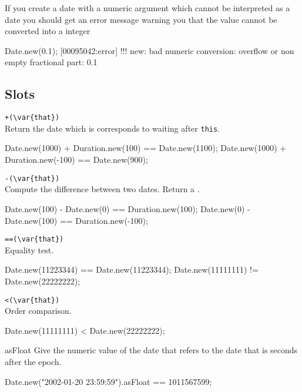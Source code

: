 If you create a date with a numeric argument which cannot be interpreted as
a date you should get an error message warning you that the value cannot be
converted into a integer

\begin{urbiscript}
Date.new(0.1);
[00095042:error] !!! new: bad numeric conversion: overflow or non empty fractional part: 0.1
\end{urbiscript}

\subsection{Slots}

\begin{urbiscriptapi}
\item \lstinline|+(\var{that})|\\
  Return the date which is corresponds to waiting 
   after \lstinline|this|.
\begin{urbiassert}
Date.new(1000) + Duration.new(100) == Date.new(1100);
Date.new(1000) + Duration.new(-100) == Date.new(900);
\end{urbiassert}

\item \lstinline|-(\var{that})|\\
  Compute the difference between two dates.  Return a
  .
\begin{urbiassert}
Date.new(100) - Date.new(0) == Duration.new(100);
Date.new(0) - Date.new(100) == Duration.new(-100);
\end{urbiassert}

\item \lstinline|==(\var{that})|\\
  Equality test.
\begin{urbiassert}
Date.new(11223344) == Date.new(11223344);
Date.new(11111111) != Date.new(22222222);
\end{urbiassert}

\item \lstinline|<(\var{that})|\\
  Order comparison.
\begin{urbiassert}
Date.new(11111111) < Date.new(22222222);
\end{urbiassert}

\item[asFloat]
  Give the numeric value of the date that refers to the date that is 
seconds after the epoch.
\begin{urbiassert}
Date.new("2002-01-20 23:59:59").asFloat == 1011567599;
\end{urbiassert}


\end{urbiscriptapi}
